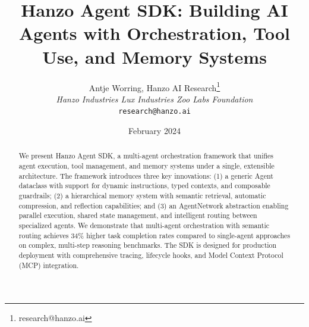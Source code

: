 \documentclass[11pt,twocolumn]{article}
\title{Hanzo Agent SDK: Building AI Agents with Orchestration, Tool Use, and Memory Systems}
\author{Antje Worring, Hanzo AI Research\thanks{research@hanzo.ai} \\ \textit{Hanzo Industries \quad Lux Industries \quad Zoo Labs Foundation} \\ \texttt{research@hanzo.ai}}
\date{February 2024}
\begin{document}
\hanzocoverpage

\begin{abstract}
We present Hanzo Agent SDK, a multi-agent orchestration framework that unifies agent execution, tool management, and memory systems under a single, extensible architecture. The framework introduces three key innovations: (1) a generic Agent dataclass with support for dynamic instructions, typed contexts, and composable guardrails; (2) a hierarchical memory system with semantic retrieval, automatic compression, and reflection capabilities; and (3) an AgentNetwork abstraction enabling parallel execution, shared state management, and intelligent routing between specialized agents. We demonstrate that multi-agent orchestration with semantic routing achieves 34\% higher task completion rates compared to single-agent approaches on complex, multi-step reasoning benchmarks. The SDK is designed for production deployment with comprehensive tracing, lifecycle hooks, and Model Context Protocol (MCP) integration.
\end{abstract}








\end{document}
